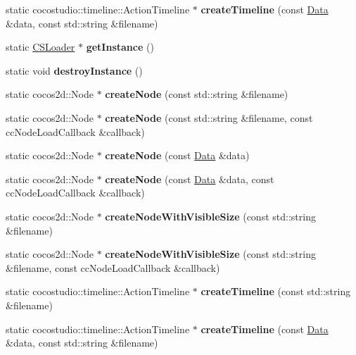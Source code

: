 \begin{DoxyCompactItemize}
\mbox{\label{classCSLoader_a7c5dbdf5684f1c8afd0fd4daf8707bcc}} 
static cocostudio\+::timeline\+::\+Action\+Timeline $\ast$ {\bfseries create\+Timeline} (const \hyperlink{classData}{Data} \&data, const std\+::string \&filename)
\item 
\mbox{\label{classCSLoader_ad4c4c00ca814704555abc9cf2a2c0ffc}} 
static \hyperlink{classCSLoader}{C\+S\+Loader} $\ast$ {\bfseries get\+Instance} ()
\item 
\mbox{\label{classCSLoader_a088f239f3b4c08ec5593cbfd7f371b83}} 
static void {\bfseries destroy\+Instance} ()
\item 
\mbox{\label{classCSLoader_a99afbc23ee6c600c96bba8966b116cf3}} 
static cocos2d\+::\+Node $\ast$ {\bfseries create\+Node} (const std\+::string \&filename)
\item 
\mbox{\label{classCSLoader_a6275e59f77821a2ea45f00038ead9017}} 
static cocos2d\+::\+Node $\ast$ {\bfseries create\+Node} (const std\+::string \&filename, const cc\+Node\+Load\+Callback \&callback)
\item 
\mbox{\label{classCSLoader_a2143f27df47e2f6da00c06b1867c433a}} 
static cocos2d\+::\+Node $\ast$ {\bfseries create\+Node} (const \hyperlink{classData}{Data} \&data)
\item 
\mbox{\label{classCSLoader_abdfe141598c46ad30e10385a94d809d6}} 
static cocos2d\+::\+Node $\ast$ {\bfseries create\+Node} (const \hyperlink{classData}{Data} \&data, const cc\+Node\+Load\+Callback \&callback)
\item 
\mbox{\label{classCSLoader_a2bf9adab9f7590fdb6567f1b58466189}} 
static cocos2d\+::\+Node $\ast$ {\bfseries create\+Node\+With\+Visible\+Size} (const std\+::string \&filename)
\item 
\mbox{\label{classCSLoader_a2a60a91a5ee44c534f43e70bcd7c4239}} 
static cocos2d\+::\+Node $\ast$ {\bfseries create\+Node\+With\+Visible\+Size} (const std\+::string \&filename, const cc\+Node\+Load\+Callback \&callback)
\item 
\mbox{\label{classCSLoader_ac999da01c7f49200584792fc5388d673}} 
static cocostudio\+::timeline\+::\+Action\+Timeline $\ast$ {\bfseries create\+Timeline} (const std\+::string \&filename)
\item 
\mbox{\label{classCSLoader_aebb89ee6a314aa6b7fd765a6833a6bb4}} 
static cocostudio\+::timeline\+::\+Action\+Timeline $\ast$ {\bfseries create\+Timeline} (const \hyperlink{classData}{Data} \&data, const std\+::string \&filename)
\end{DoxyCompactItemize}

